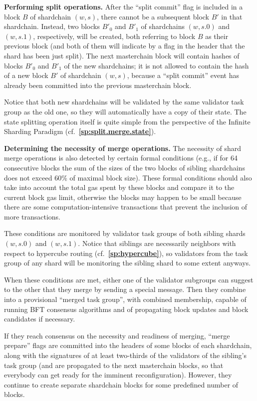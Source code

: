 \documentclass[12pt,oneside]{article}
\def\makepoint#1{\medbreak\noindent{\bf #1.\ }}
\def\nxsubpoint{\refstepcounter{subsubsection}%
  \smallbreak\makepoint{\thesubsubsection}}
\def\refpoint#1{{\rm\textbf{\ref{#1}}}}
\let\ptref=\refpoint
\def\embt(#1.){\textbf{#1.}}
\begin{document}
\nxsubpoint \embt(Performing split operations.)  After the ``split
commit'' flag is included in a block $B$ of shardchain $(w,s)$, there
cannot be a subsequent block $B'$ in that shardchain. Instead, two
blocks $B'_0$ and $B'_1$ of shardchains $(w,s.0)$ and $(w,s.1)$,
respectively, will be created, both referring to block $B$ as their
previous block (and both of them will indicate by a flag in the header
that the shard has been just split). The next masterchain block will
contain hashes of blocks $B'_0$ and $B'_1$ of the new shardchains; it
is not allowed to contain the hash of a new block $B'$ of shardchain
$(w,s)$, because a ``split commit'' event has already been committed
into the previous masterchain block.

Notice that both new shardchains will be validated by the same
validator task group as the old one, so they will automatically have a
copy of their state. The state splitting operation itself is quite
simple from the perspective of the Infinite Sharding Paradigm
(cf.~\ptref{sp:split.merge.state}).

\nxsubpoint\label{sp:merge.necess} \embt(Determining the necessity of
merge operations.)  The necessity of shard merge operations is also
detected by certain formal conditions (e.g., if for 64 consecutive
blocks the sum of the sizes of the two blocks of sibling shardchains
does not exceed $60\%$ of maximal block size). These formal conditions
should also take into account the total gas spent by these blocks and
compare it to the current block gas limit, otherwise the blocks may
happen to be small because there are some computation-intensive
transactions that prevent the inclusion of more transactions.

These conditions are monitored by validator task groups of both
sibling shards $(w,s.0)$ and $(w,s.1)$. Notice that siblings are
necessarily neighbors with respect to hypercube routing
(cf.~\ptref{sp:hypercube}), so validators from the task group of any
shard will be monitoring the sibling shard to some extent anyways.

When these conditions are met, either one of the validator subgroups
can suggest to the other that they merge by sending a special
message. Then they combine into a provisional ``merged task group'',
with combined membership, capable of running BFT consensus algorithms
and of propagating block updates and block candidates if necessary.

If they reach consensus on the necessity and readiness of merging,
``merge prepare'' flags are committed into the headers of some blocks
of each shardchain, along with the signatures of at least two-thirds
of the validators of the sibling's task group (and are propagated to
the next masterchain blocks, so that everybody can get ready for the
imminent reconfiguration). However, they continue to create separate
shardchain blocks for some predefined number of blocks.
\end{document}

